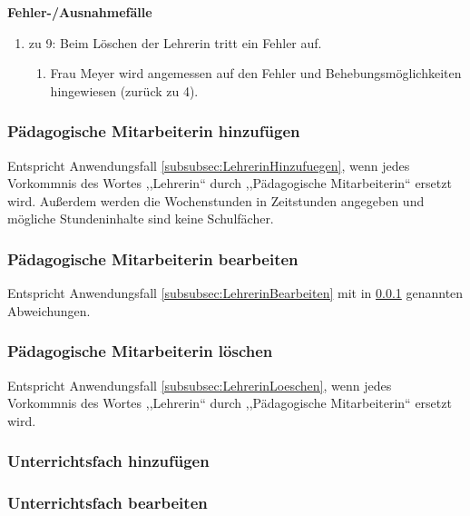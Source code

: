 \documentclass[fontsize=12pt,paper=a4,twoside]{scrartcl}
\begin{document}
\textbf{Fehler-/Ausnahmefälle}
\begin{enumerate}
\item zu 9: Beim Löschen der Lehrerin tritt ein Fehler auf.
	\begin{enumerate}[label=\arabic*.]
	\item Frau Meyer wird angemessen auf den Fehler und Behebungsmöglichkeiten hingewiesen (zurück zu 4).
	\end{enumerate}
\end{enumerate}

\subsubsection{Pädagogische Mitarbeiterin hinzufügen}
\label{subsubsec:PaedMitarbeiterinHinzufuegen}
Entspricht Anwendungsfall \ref{subsubsec:LehrerinHinzufuegen}, wenn jedes Vorkommnis des Wortes ,,Lehrerin`` durch ,,Pädagogische Mitarbeiterin`` ersetzt wird. Außerdem werden die Wochenstunden in Zeitstunden angegeben und mögliche Stundeninhalte sind keine Schulfächer.


\subsubsection{Pädagogische Mitarbeiterin bearbeiten}
\label{subsubsec:PaedMitarbeiterinBearbeiten}
Entspricht Anwendungsfall \ref{subsubsec:LehrerinBearbeiten} mit in \ref{subsubsec:PaedMitarbeiterinHinzufuegen} genannten Abweichungen. 



\subsubsection{Pädagogische Mitarbeiterin löschen}
\label{subsubsec:PaedMitarbeiterinLoeschen}
Entspricht Anwendungsfall \ref{subsubsec:LehrerinLoeschen}, wenn jedes Vorkommnis des Wortes ,,Lehrerin`` durch ,,Pädagogische Mitarbeiterin`` ersetzt wird. 

\subsubsection{Unterrichtsfach hinzufügen}

\subsubsection{Unterrichtsfach bearbeiten}
\end{document}
